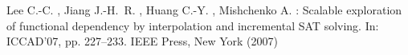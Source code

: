 \documentclass[runningheads,a4paper]{llncs}
\begin{document}
\begin{thebibliography}{4}
Lee C.-C. ,
Jiang J.-H.~R. ,
Huang C.-Y. ,
Mishchenko A.
:
Scalable exploration of functional dependency by interpolation and incremental SAT solving.
In: ICCAD'07,
pp. 227--233.
IEEE Press,
New York (2007)


















\end{thebibliography}
\end{document}

